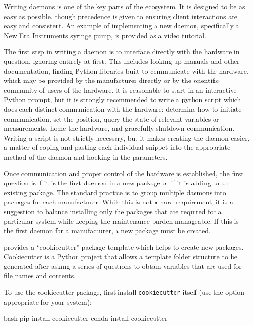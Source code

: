 Writing daemons is one of the key parts of the \yaq{} ecosystem.
It is designed to be as easy as possible, though precedence is given to ensuring client interactions are easy and consistent.
An example of implementing a new daemon, specifically a New Era Instruments syringe pump, is provided as a video tutorial\cite{letsyaq}.


The first step in writing a daemon is to interface directly with the hardware in question, ignoring \yaq{} entirely at first.
This includes looking up manuals and other documentation, finding Python libraries built to communicate with the hardware, which may be provided by the manufacturer directly or by the scientific community of users of the hardware.
It is reasonable to start in an interactive Python prompt, but it is strongly recommended to write a python script which does each distinct communication with the hardware: determine how to initiate communication, set the position, query the state of relevant variables or measurements, home the hardware, and gracefully shutdown communication.
Writing a script is not strictly necessary, but it makes creating the daemon easier, a matter of coping and pasting each individual snippet into the appropriate method of the daemon and hooking in the parameters.

Once communication and proper control of the hardware is established, the first question is if it is the first daemon in a new package or if it is adding to an existing package.
The standard practice is to group multiple daemons into packages for each manufacturer.
While this is not a hard requirement, it is a suggestion to balance installing only the packages that are required for a particular system while keeping the maintenance burden manageable.
If this is the first daemon for a manufacturer, a new package must be created.

\yaq{} provides a ``cookiecutter'' package template which helps to create new \yaq{} packages\cite{yaqd-cookiecutter}.
Cookiecutter is a Python project that allows a template folder structure to be generated after asking a series of questions to obtain variables that are used for file names and contents\cite{cookiecutter}.

To use the \yaq{} cookiecutter package, first install \texttt{cookiecutter} itself (use the option appropriate for your system):

\begin{codefragment}{bash}
pip install cookiecutter
conda install cookiecutter
\end{codefragment}

